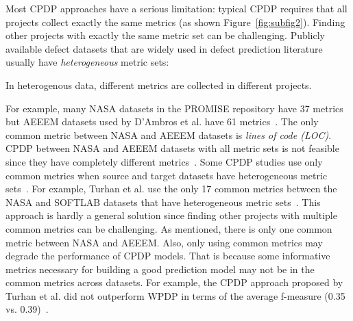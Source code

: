 Most CPDP approaches have a serious limitation:
typical CPDP requires that all projects collect exactly the same metrics (as shown Figure~\ref{fig:subfig2}). Finding other projects with exactly
the same metric set can be challenging. Publicly available defect
datasets that are widely used in defect prediction literature usually have
{\em heterogeneous} metric sets:
\squishlist
\item

In   heterogenous data, different metrics are collected in different projects.
\item
For example, many NASA datasets in the PROMISE repository have 37 metrics but
AEEEM datasets used by D'Ambros et al. have 61
metrics~\cite{DAmbros12,promise12}.
The only common metric between NASA and AEEEM datasets is {\em lines of
code (LOC)}.
CPDP between NASA and AEEEM
datasets with all metric sets is not feasible since they have
completely different metrics~\cite{Turhan09}.
\squishend
Some CPDP studies use only common metrics when source and target datasets have
heterogeneous metric sets~\cite{Ma12,Turhan09}.
For example, Turhan et al. use the only 17 common metrics between the NASA and
SOFTLAB datasets that have heterogeneous metric sets~\cite{Turhan09}. 
This approach is hardly a general solution since
finding other projects with multiple common metrics can be challenging. As
mentioned, there is only one common metric between NASA and AEEEM. Also,
only using common metrics may degrade the performance of CPDP models.
That is because some informative metrics necessary for building a good prediction model may not
be in the common metrics across datasets. For example, the CPDP approach proposed by Turhan et al. did not
outperform WPDP in terms of the average
f-measure (0.35 vs. 0.39)~\cite{Turhan09}.

